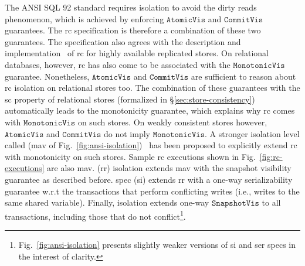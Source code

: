 The ANSI SQL 92 standard requires  isolation to
avoid the dirty reads phenomenon, which is achieved by enforcing
$\mathtt{AtomicVis}$ and $\mathtt{CommitVis}$ guarantees. The {\sc rc}
specification is therefore a combination of these two guarantees. The
specification also agrees with the description and
implementation~\cite{bailishat,pldi15} of {\sc rc} for highly
available replicated stores. On relational databases, however, {\sc
rc} has also come to be associated with the $\mathtt{MonotonicVis}$
guarantee.  Nonetheless, $\mathtt{AtomicVis}$ and $\mathtt{CommitVis}$
are sufficient to reason about {\sc rc} isolation on relational stores
too. The combination of these guarantees with the {\sc sc} property of
relational stores (formalized in \S\ref{sec:store-consistency})
automatically leads to the monotonicity guarantee, which 
explains why {\sc rc} comes with $\mathtt{MonotonicVis}$ on such
stores. On weakly consistent stores however, $\mathtt{AtomicVis}$ and
$\mathtt{CommitVis}$ do not imply $\mathtt{MonotonicVis}$. A stronger
isolation level called  ({\sc mav} of
Fig.~\ref{fig:ansi-isolation})~\cite{bailishat,pldi15} has been proposed to
explicitly extend {\sc rc} with monotonicity on such stores. Sample
{\sc rc} executions shown in Fig.~\ref{fig:rc-executions} are also
{\sc mav}.  ({\sc rr}) isolation  extends {\sc mav}
with the snapshot visibility guarantee as described before.
 spec ({\sc si}) extends {\sc rr} with a
one-way serializability guarantee w.r.t the transactions that perform
conflicting writes (i.e., writes to the same shared variable).
Finally,  isolation extends one-way
$\mathtt{SnapshotVis}$ to all transactions, including those that do
not conflict\footnote{Fig.~\ref{fig:ansi-isolation} presents slightly
weaker versions of {\sc si} and {\sc ser} specs in the interest of
clarity.}. 


